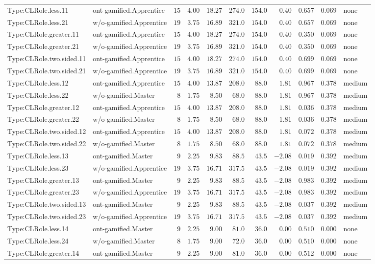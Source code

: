 \documentclass[6pt,a4paper]{article}
\begin{document}
{\begin{longtable}{llrrrrrrrrl}
Type:CLRole.less.11&ont-gamified.Apprentice&$15$&$4.00$&$18.27$&$274.0$&$154.0$&$ 0.40$&$0.657$&$0.069$&none\tabularnewline
Type:CLRole.less.21&w/o-gamified.Apprentice&$19$&$3.75$&$16.89$&$321.0$&$154.0$&$ 0.40$&$0.657$&$0.069$&none\tabularnewline
Type:CLRole.greater.11&ont-gamified.Apprentice&$15$&$4.00$&$18.27$&$274.0$&$154.0$&$ 0.40$&$0.350$&$0.069$&none\tabularnewline
Type:CLRole.greater.21&w/o-gamified.Apprentice&$19$&$3.75$&$16.89$&$321.0$&$154.0$&$ 0.40$&$0.350$&$0.069$&none\tabularnewline
Type:CLRole.two.sided.11&ont-gamified.Apprentice&$15$&$4.00$&$18.27$&$274.0$&$154.0$&$ 0.40$&$0.699$&$0.069$&none\tabularnewline
Type:CLRole.two.sided.21&w/o-gamified.Apprentice&$19$&$3.75$&$16.89$&$321.0$&$154.0$&$ 0.40$&$0.699$&$0.069$&none\tabularnewline
Type:CLRole.less.12&ont-gamified.Apprentice&$15$&$4.00$&$13.87$&$208.0$&$ 88.0$&$ 1.81$&$0.967$&$0.378$&medium\tabularnewline
Type:CLRole.less.22&w/o-gamified.Master&$ 8$&$1.75$&$ 8.50$&$ 68.0$&$ 88.0$&$ 1.81$&$0.967$&$0.378$&medium\tabularnewline
Type:CLRole.greater.12&ont-gamified.Apprentice&$15$&$4.00$&$13.87$&$208.0$&$ 88.0$&$ 1.81$&$0.036$&$0.378$&medium\tabularnewline
Type:CLRole.greater.22&w/o-gamified.Master&$ 8$&$1.75$&$ 8.50$&$ 68.0$&$ 88.0$&$ 1.81$&$0.036$&$0.378$&medium\tabularnewline
Type:CLRole.two.sided.12&ont-gamified.Apprentice&$15$&$4.00$&$13.87$&$208.0$&$ 88.0$&$ 1.81$&$0.072$&$0.378$&medium\tabularnewline
Type:CLRole.two.sided.22&w/o-gamified.Master&$ 8$&$1.75$&$ 8.50$&$ 68.0$&$ 88.0$&$ 1.81$&$0.072$&$0.378$&medium\tabularnewline
Type:CLRole.less.13&ont-gamified.Master&$ 9$&$2.25$&$ 9.83$&$ 88.5$&$ 43.5$&$-2.08$&$0.019$&$0.392$&medium\tabularnewline
Type:CLRole.less.23&w/o-gamified.Apprentice&$19$&$3.75$&$16.71$&$317.5$&$ 43.5$&$-2.08$&$0.019$&$0.392$&medium\tabularnewline
Type:CLRole.greater.13&ont-gamified.Master&$ 9$&$2.25$&$ 9.83$&$ 88.5$&$ 43.5$&$-2.08$&$0.983$&$0.392$&medium\tabularnewline
Type:CLRole.greater.23&w/o-gamified.Apprentice&$19$&$3.75$&$16.71$&$317.5$&$ 43.5$&$-2.08$&$0.983$&$0.392$&medium\tabularnewline
Type:CLRole.two.sided.13&ont-gamified.Master&$ 9$&$2.25$&$ 9.83$&$ 88.5$&$ 43.5$&$-2.08$&$0.037$&$0.392$&medium\tabularnewline
Type:CLRole.two.sided.23&w/o-gamified.Apprentice&$19$&$3.75$&$16.71$&$317.5$&$ 43.5$&$-2.08$&$0.037$&$0.392$&medium\tabularnewline
Type:CLRole.less.14&ont-gamified.Master&$ 9$&$2.25$&$ 9.00$&$ 81.0$&$ 36.0$&$ 0.00$&$0.510$&$0.000$&none\tabularnewline
Type:CLRole.less.24&w/o-gamified.Master&$ 8$&$1.75$&$ 9.00$&$ 72.0$&$ 36.0$&$ 0.00$&$0.510$&$0.000$&none\tabularnewline
Type:CLRole.greater.14&ont-gamified.Master&$ 9$&$2.25$&$ 9.00$&$ 81.0$&$ 36.0$&$ 0.00$&$0.512$&$0.000$&none\tabularnewline

\end{longtable}}
\end{document}
